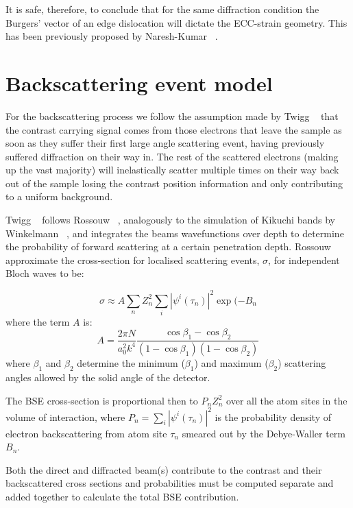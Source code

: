 It is safe, therefore, to conclude that for the same diffraction condition the Burgers' vector of an edge dislocation will dictate the ECC-strain geometry. This has been previously proposed by Naresh-Kumar \etal~\cite{Naresh}.




\section{Backscattering event model}


For the backscattering process we follow the assumption made by Twigg \etal~\cite{Twigg09} that the contrast carrying signal comes from those electrons that leave the sample as soon as they suffer their first large angle scattering event, having previously suffered diffraction on their way in. The rest of the scattered electrons (making up the vast majority) will inelastically scatter multiple times on their way back out of the sample losing the contrast position information and only contributing to a uniform background. 

Twigg \etal~\cite{Twigg09} follows Rossouw \etal~\cite{Rossouw94}, analogously to the simulation of Kikuchi bands by Winkelmann \etal~\cite{Winkelmann07}, and integrates the beams wavefunctions over depth  to determine the probability of forward scattering at a certain penetration depth.  Rossouw \etal~\cite{Rossouw94}  approximate the cross-section for localised scattering events, $\sigma$, for independent Bloch waves to be:

\begin{equation}
    \sigma \approx A \sum_n Z_n^2 \sum_i | \psi^i(\tau_n)|^2 \exp{(-B_n}
\end{equation}
where the term $A$ is:
\begin{equation}
    A = \frac{2\pi N}{a_0^2 k^4} \frac{\cos{\beta_1} - \cos{\beta_2}}{(1-\cos{\beta_1})(1-\cos{\beta_2})}
\end{equation}
where $\beta_1$ and $\beta_2$ determine the minimum ($\beta_1$) and maximum ($\beta_2$) scattering angles allowed by the solid angle of the detector.

The BSE cross-section is proportional then to $P_n Z_n^2$ over all the atom sites in the volume of interaction, where $P_n=\sum_i |\psi^i(\tau_n)|^2$ is the probability density of electron backscattering from atom site $\tau_n$ smeared out by the Debye-Waller term $B_n$.


Both the direct and diffracted beam(s) contribute to the contrast and their backscattered cross sections and probabilities must be computed separate and added together to calculate the total BSE contribution.
 





